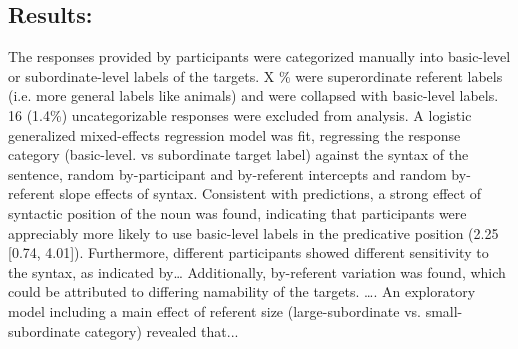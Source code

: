 \subsection{Results:}
The responses provided by participants were categorized manually into basic-level or subordinate-level labels of the targets. X \% were superordinate referent labels (i.e. more general labels like animals) and were collapsed with basic-level labels. 16 (1.4\%) uncategorizable responses were excluded from analysis. 
A logistic generalized mixed-effects regression model was fit, regressing the response category (basic-level. vs subordinate target label) against the syntax of the sentence, random by-participant and by-referent intercepts and random by-referent slope effects of syntax. 
Consistent with predictions, a strong effect of syntactic position of the noun was found, indicating that participants were appreciably more likely to use basic-level labels in the predicative position (2.25 [0.74, 4.01]). 
Furthermore, different participants showed different sensitivity to the syntax, as indicated by… Additionally, by-referent variation was found, which could be attributed to differing namability of the targets. ….
An exploratory model including a main effect of referent size (large-subordinate vs. small-subordinate category) revealed that... 
 
 
